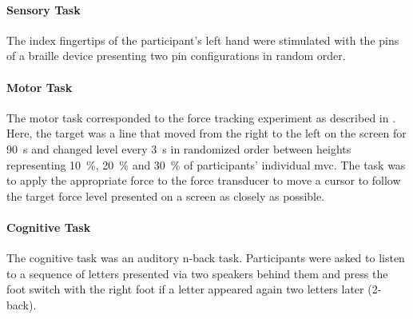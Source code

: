 \paragraph{Sensory Task}
The index fingertips of the participant's left hand were stimulated with the pins of a braille device presenting two pin configurations in random order. 
\paragraph{Motor Task} 
The motor task corresponded to the force tracking experiment as described in . Here, the target was a line that moved from the right to the left on the screen for 90~s and changed level every 3~s in randomized order between heights representing 10~\%, 20~\% and 30~\% of participants' individual \gls{mvc}. The task was to apply the appropriate force to the force transducer to move a cursor to follow the target force level presented on a screen as closely as possible.
\paragraph{Cognitive Task}
The cognitive task was an auditory n-back task. Participants were asked to listen to a sequence of letters presented via two speakers behind them and press the foot switch with the right foot if a letter appeared again two letters later (2-back).

